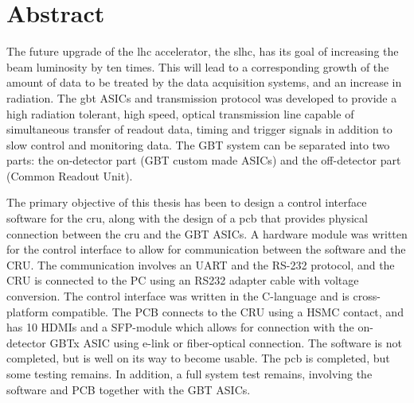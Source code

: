 \documentclass[main.tex]{subfiles}
\begin{document}
\chapter*{Abstract}
%

The future upgrade of the \acrlong{lhc} accelerator, the \acrlong{slhc}, has its goal of increasing the beam luminosity by ten times. This will lead to a corresponding growth of the amount of data to be treated by the data acquisition systems, and an increase in radiation. The \acrlong{gbt} ASICs and transmission protocol was developed to provide a high radiation tolerant, high speed, optical transmission line capable of simultaneous transfer of readout data, timing and trigger signals in addition to slow control and monitoring data. The GBT system can be separated into two parts: the on-detector part (GBT custom made ASICs) and the off-detector part (Common Readout Unit).

The primary objective of this thesis has been to design a control interface software for the \acrshort{cru}, along with the design of a \acrshort{pcb} that provides physical connection between the \acrshort{cru} and the GBT ASICs. A hardware module was written for the control interface to allow for communication between the software and the CRU. The communication involves an UART and the RS-232 protocol, and the CRU is connected to the PC using an RS232 adapter cable with voltage conversion. The control interface was written in the C-language and is cross-platform compatible. The PCB connects to the CRU using a HSMC contact, and has 10 HDMIs and a SFP-module which allows for connection with the on-detector GBTx ASIC using e-link or fiber-optical connection. 
The software is not completed, but is well on its way to become usable. The \acrshort{pcb} is completed, but some testing remains. In addition, a full system test remains, involving the software and PCB together with the GBT ASICs.
\end{document}
